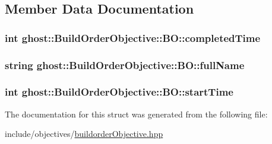 \subsection{Member Data Documentation}
\hypertarget{structghost_1_1BuildOrderObjective_1_1BO_ac61b9122d2757d44ba08984665eda144}{
\subsubsection[{completed\-Time}]{\setlength{\rightskip}{0pt plus 5cm}int ghost\-::\-Build\-Order\-Objective\-::\-B\-O\-::completed\-Time}}\label{structghost_1_1BuildOrderObjective_1_1BO_ac61b9122d2757d44ba08984665eda144}
\hypertarget{structghost_1_1BuildOrderObjective_1_1BO_ae7a6f92b372f83aca41c2e71b338a88c}{
\subsubsection[{full\-Name}]{\setlength{\rightskip}{0pt plus 5cm}string ghost\-::\-Build\-Order\-Objective\-::\-B\-O\-::full\-Name}}\label{structghost_1_1BuildOrderObjective_1_1BO_ae7a6f92b372f83aca41c2e71b338a88c}
\hypertarget{structghost_1_1BuildOrderObjective_1_1BO_a2b4eac91ba456512b3b5f0f182d7dd01}{
\subsubsection[{start\-Time}]{\setlength{\rightskip}{0pt plus 5cm}int ghost\-::\-Build\-Order\-Objective\-::\-B\-O\-::start\-Time}}\label{structghost_1_1BuildOrderObjective_1_1BO_a2b4eac91ba456512b3b5f0f182d7dd01}


The documentation for this struct was generated from the following file\-:\begin{DoxyCompactItemize}
\item 
include/objectives/\hyperlink{buildorderObjective_8hpp}{buildorder\-Objective.\-hpp}\end{DoxyCompactItemize}
